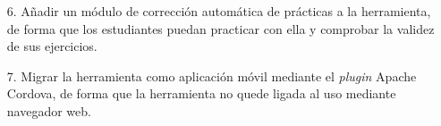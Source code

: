\begin{itemize}
\begin{itemize}

\item[6.] Añadir un módulo de corrección automática de prácticas a la herramienta, de forma que los estudiantes puedan practicar con ella y comprobar la validez de sus ejercicios.

\item[7.] Migrar la herramienta como aplicación móvil mediante el \emph{plugin} Apache Cordova, de forma que la herramienta no quede ligada al uso mediante navegador web.

\end{itemize}

\end{itemize}


